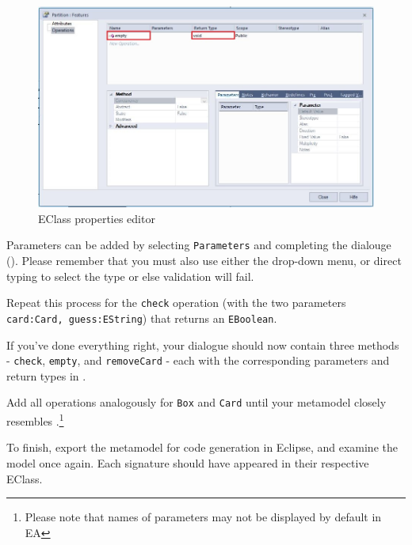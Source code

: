 \begin{stepbystep}
\begin{figure}[htbp]
	\centering
  	\includegraphics[width=\textwidth]{../../org.moflon.doc.handbook.02_leitnersLearningBox/2_staticSemantics/4_creatingMethods/cmVisImages/ea_operationEmpty}
	\caption{EClass properties editor}
	\label{ea:operation_properties}
\end{figure}


\item  Parameters can be added by selecting \texttt{Parameters} and
completing the dialouge (). Please remember that you must also use either the drop-down menu, or direct typing to select the type or else validation
will fail.

\item  Repeat this process for the \texttt{check} operation (with the two parameters \texttt{card:Card, guess:EString}) that returns an \texttt{EBoolean}. 

\item  If you've done everything right, your dialogue should now contain three methods - \texttt{check}, \texttt{empty}, and
\texttt{removeCard} - each with the corresponding parameters and return types in .


\item  Add all operations analogously for \texttt{Box} and \texttt{Card} until your metamodel closely resembles
.\footnote{Please note that names of parameters may not be displayed by default in EA}

\item  To finish, export the metamodel for code generation in Eclipse, and examine the model once again. Each signature should have
appeared in their respective EClass.


\end{stepbystep}
